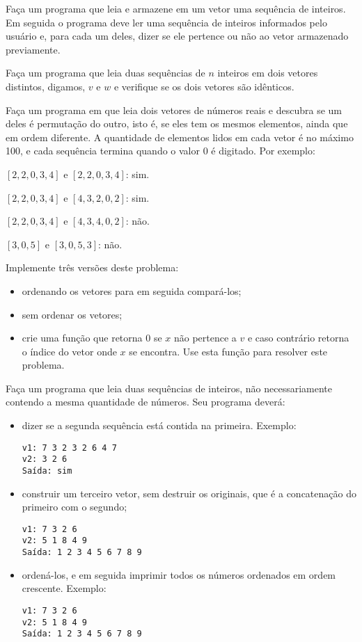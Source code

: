 \item Faça  um programa que leia e  armazene em um vetor  uma sequência de
inteiros.  Em seguida  o programa  deve  ler uma  sequência de  inteiros
informados pelo usuário e, para cada  um deles, dizer se ele pertence ou
não ao vetor armazenado previamente. 

\item Faça um  programa que  leia duas  sequências de  $n$ inteiros  em dois
vetores distintos,  digamos, $v$ e  $w$ e verifique  se os dois  vetores são
idênticos. 

\item Faça um programa em  que leia dois vetores de números reais
e descubra se um deles é permutação do outro, isto é, se eles
tem os mesmos elementos, ainda que em ordem diferente.
A quantidade de elementos lidos em cada vetor é no  máximo 100,  e
cada sequência termina quando o valor 0 é digitado. 
Por   exemplo: 

        $[2,2,0,3,4]$   e  $[2,2,0,3,4]$:   sim.
  
        $[2,2,0,3,4]$ e  $[4,3,2,0,2]$: sim.
        
        $[2,2,0,3,4]$ e $[4,3,4,0,2]$: não. 
        
        $[3,0,5]$ e $[3,0,5,3]$: não.

Implemente três
versões deste problema:
\begin{itemize}
\item ordenando os vetores para em seguida compará-los;
\item sem ordenar os vetores;
\item crie uma
 função que  retorna  0 se $x$  não  pertence a  $v$ e  caso contrário
 retorna o índice  do vetor onde  $x$  se encontra. Use esta função para 
 resolver este problema. 
\end{itemize}




\item Faça  um  programa  que   leia  duas  sequências  de  inteiros,  não
necessariamente  contendo a  mesma quantidade  de números. Seu programa
deverá:
\begin{itemize} 
\item dizer  se a segunda sequência está contida na primeira. Exemplo:
\begin{verbatim}
v1: 7 3 2 3 2 6 4 7 
v2: 3 2 6
Saída: sim
\end{verbatim}
\item construir um terceiro  vetor, sem  destruir os  originais, que é  
      a concatenação  do primeiro com o segundo;
\begin{verbatim}
v1: 7 3 2 6
v2: 5 1 8 4 9
Saída: 1 2 3 4 5 6 7 8 9
\end{verbatim}
\item ordená-los, e em seguida imprimir todos os números ordenados 
      em ordem crescente. Exemplo:
\begin{verbatim}
v1: 7 3 2 6
v2: 5 1 8 4 9
Saída: 1 2 3 4 5 6 7 8 9
\end{verbatim}
\end{itemize}

